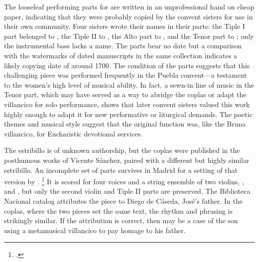 
The looseleaf performing parts for  are written in an
unprofessional hand on cheap paper, indicating that they were probably copied
by the convent sisters for use in their own community.
Four sisters wrote their names in their parts:
the Tiple I part belonged to , the Tiple II to , the Alto part to , and the Tenor part
to ; only the instrumental bass lacks a name.
The parts bear no date but a comparison with the watermarks of dated
manuscripts in the same collection indicates a likely copying date of around
1700.
The condition of the parts suggests that this challenging piece was performed
frequently in the Puebla convent---a testament to the women's high level of
musical ability.
In fact, a sewn-in line of music in the Tenor part, which may have served as a
way to abridge the coplas or adapt the villancico for solo performance, shows
that later convent sisters valued this work highly enough to adapt it for new
performative or liturgical demands.
The poetic themes and musical style suggest that the original function was,
like the Bruna villancico, for Eucharistic devotional services.


The estribillo is of unknown authorship, but the coplas were published in the
posthumous works of Vicente Sánchez, paired with a different but highly similar
estribillo.%
   \Autocite
   [190--191:
   ]
   {Sanchez:LiraPoetica}  
An incomplete set of parts survives in Madrid for a setting of that version by
.%
    \footnote{.}
It is scored for four voices and a string ensemble of two violins,
, and , but only the second violin and Tiple
II parts are preserved.
The Biblioteca Nacional catalog attributes the piece to Diego de Cáseda, José's
father.
In the coplas, where the two pieces set the same text, the rhythm and phrasing
is strikingly similar.
If the attribution is correct, then  may be a case of
the son using a metamusical villancico to pay homage to his father.

